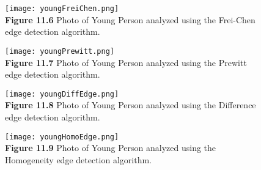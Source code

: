 \documentclass{article}%
\begin{document}
\newpage
\begin{figure}[h]
\centering
\texttt{[image: youngFreiChen.png]}\\
{\bf Figure 11.6} Photo of Young Person analyzed using the Frei-Chen edge detection algorithm.  
\end{figure}

\newpage
\begin{figure}[h]
\centering
\texttt{[image: youngPrewitt.png]}\\
{\bf Figure 11.7} Photo of Young Person analyzed using the Prewitt edge detection algorithm.  
\end{figure}

\newpage
\begin{figure}[h]
\centering
\texttt{[image: youngDiffEdge.png]}\\
{\bf Figure 11.8} Photo of Young Person analyzed using the Difference edge detection algorithm.  
\end{figure}

\newpage
\begin{figure}[h]
\centering
\texttt{[image: youngHomoEdge.png]}\\
{\bf Figure 11.9} Photo of Young Person analyzed using the Homogeneity edge detection algorithm.  
\end{figure}
\clearpage


\newpage
\end{document}
